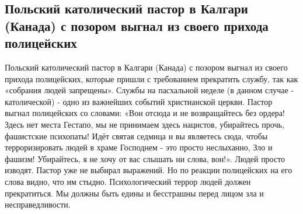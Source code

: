  
 
 
 
 

\subsection{Польский католический пастор в Калгари (Канада) с позором выгнал из своего прихода полицейских}
\label{sec:05_04_2021.fb.freedom_vlad.1.pastor}

Польский католический пастор в Калгари (Канада) с позором выгнал из своего
прихода полицейских, которые пришли с требованием прекратить службу, так как
«собрания людей запрещены». Службы на пасхальной неделе (в данном случае -
католической) - одно из важнейших событий христианской церкви. Пастор выгнал
полицейских со словами: «Вон отсюда и не возвращайтесь без ордера! Здесь нет
места Гестапо, мы не принимаем здесь нацистов, убирайтесь прочь, фашистские
психопаты! Идёт святая седмица и вы являетесь сюда, чтобы терроризировать людей
в храме Господнем - это просто неслыханно, Зло и фашизм! Убирайтесь, я не хочу
от вас слышать ни слова, вон!».  Людей просто изводят. Пастор уже не выбирал
выражений. Но по реакции полицейских на его слова видно, что им стыдно.
Психологический террор людей должен прекратиться. Мы должны быть едины и
бесстрашны перед лицом зла и несправедливости.
